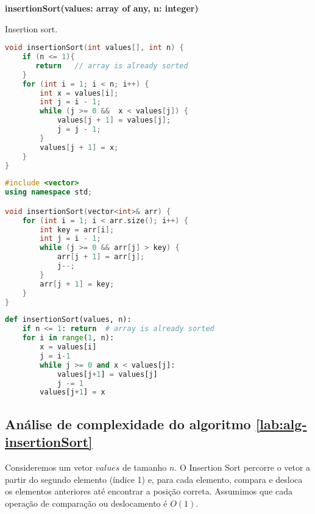 \begin{center}
\begin{minipage}{.9\linewidth}
\begin{algorithm}[H]
\DontPrintSemicolon
\textbf{insertionSort(values: array of any, n: integer)}

\caption{Insertion sort.}
\label{lab:alg-insertionSort}
\end{algorithm}
\end{minipage}
\end{center}
    
\begin{lstlisting}[language=C,caption={insertion sort em C},captionpos=t]
void insertionSort(int values[], int n) {
    if (n <= 1){
       return   // array is already sorted
    }  
    for (int i = 1; i < n; i++) {
        int x = values[i];
        int j = i - 1;
        while (j >= 0 &&  x < values[j]) {
            values[j + 1] = values[j];
            j = j - 1;
        }
        values[j + 1] = x;
    }
}    
\end{lstlisting}

\begin{lstlisting}[language=C++,caption={Insertion sort em C++},captionpos=t]
#include <vector>
using namespace std;

void insertionSort(vector<int>& arr) {
    for (int i = 1; i < arr.size(); i++) {
        int key = arr[i];
        int j = i - 1;
        while (j >= 0 && arr[j] > key) {
            arr[j + 1] = arr[j];
            j--;
        }
        arr[j + 1] = key;
    }
}
\end{lstlisting}

\begin{lstlisting}[language=python,caption={insertion sort em Python},captionpos=t]
def insertionSort(values, n):
    if n <= 1: return  # array is already sorted
    for i in range(1, n):  
        x = values[i]  
        j = i-1
        while j >= 0 and x < values[j]:  
            values[j+1] = values[j]  
            j -= 1
        values[j+1] = x  
\end{lstlisting}

\subsection{Análise de complexidade do algoritmo \ref{lab:alg-insertionSort}}
Consideremos um vetor $values$ de tamanho $n$. O Insertion Sort percorre o vetor a partir do segundo elemento (índice 1) e, para cada elemento, compara e desloca os elementos anteriores até encontrar a posição correta. Assumimos que cada operação de comparação ou deslocamento é $O(1)$.


